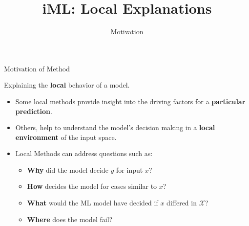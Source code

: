 \documentclass[aspectratio=169]{../latex_main/tntbeamer}  %
\title[Introduction]{iML: Local Explanations}
\subtitle{Motivation}
\begin{document}
	
	\maketitle


\begin{frame}[c]{Motivation of Method}
 
 Explaining the \textbf{local} behavior of a model.
	\begin{itemize}
		\item Some local methods provide insight into the driving factors for a \textbf{particular prediction}. 
		\item Others, help to understand the model's decision making in a \textbf{local environment} of the input space.
		\pause
		\smallskip
		\item Local Methods can address questions such as: 
		\begin{itemize}
		    \item \textbf{Why} did the model decide $y$ for input $x$?
		    \item \textbf{How} decides the model for cases similar to $x$?
		    \item \textbf{What} would the ML model have decided if $x$ differed in $\mathcal{X}$?
		    \item  \textbf{Where} does the model fail?
		\end{itemize}  
	\end{itemize}
\end{frame}
\end{document}
